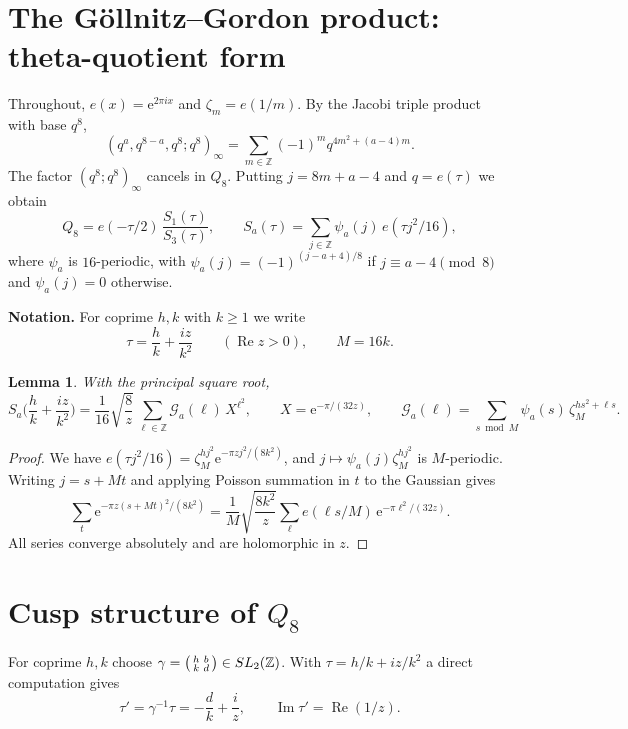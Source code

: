 \documentclass[11pt]{amsart}
\newtheorem{lemma}[theorem]{Lemma}
\theoremstyle{remark}
\theoremstyle{definition}
\newcommand{\Z}{\mathbb Z}
\newcommand{\cG}{\mathcal G}
\newcommand{\Rea}{\operatorname{Re}}
\newcommand{\Ima}{\operatorname{Im}}
\newcommand{\e}{\mathrm e}
\begin{document}
\section{The G\"ollnitz--Gordon product: theta-quotient form}\label{sec:prelim}

Throughout, $e(x)=\e^{2\pi ix}$ and $\zeta_m=e(1/m)$. By the Jacobi triple product with base $q^8$,
\[
(q^a,q^{8-a},q^8;q^8)_\infty=\sum_{m\in\Z}(-1)^mq^{4m^2+(a-4)m}.
\]
The factor $(q^8;q^8)_\infty$ cancels in $Q_8$. Putting $j=8m+a-4$ and $q=e(\tau)$ we obtain
\begin{equation}\label{eq:theta-quotient}
Q_8=e(-\tau/2)\,\frac{S_1(\tau)}{S_3(\tau)},\qquad S_a(\tau)=\sum_{j\in\Z}\psi_a(j)\,e(\tau j^2/16),
\end{equation}
where $\psi_a$ is $16$-periodic, with $\psi_a(j)=(-1)^{(j-a+4)/8}$ if $j\equiv a-4\pmod8$ and $\psi_a(j)=0$ otherwise.

\medskip\noindent\textbf{Notation.} For coprime $h,k$ with $k\ge1$ we write
\[
\tau=\frac hk+\frac{iz}{k^2}\qquad(\Rea z>0),\qquad M=16k .
\]

\begin{lemma}\label{lem:poisson}
With the principal square root,
\[
S_a\Big(\frac hk+\frac{iz}{k^2}\Big)=\frac1{16}\sqrt{\frac8z}\,\sum_{\ell\in\Z}\cG_a(\ell)\,X^{\ell^2},\qquad X=\e^{-\pi/(32z)},\qquad \cG_a(\ell)=\sum_{s\bmod M}\psi_a(s)\,\zeta_M^{hs^2+\ell s}.
\]
\end{lemma}

\begin{proof}
We have $e(\tau j^2/16)=\zeta_M^{hj^2}\e^{-\pi zj^2/(8k^2)}$, and $j\mapsto\psi_a(j)\zeta_M^{hj^2}$ is $M$-periodic. Writing $j=s+Mt$ and applying Poisson summation in $t$ to the Gaussian gives
\[
\sum_{t}\e^{-\pi z(s+Mt)^2/(8k^2)}=\frac1M\sqrt{\frac{8k^2}z}\sum_\ell e(\ell s/M)\,\e^{-\pi\ell^2/(32z)}.
\]
All series converge absolutely and are holomorphic in $z$.
\end{proof}

\section{Cusp structure of $Q_8$}\label{sec:cusps}

For coprime $h,k$ choose $\gamma=\begin{psmallmatrix}h&b\\k&d\end{psmallmatrix}\in SL_2(\Z)$. With $\tau=h/k+iz/k^2$ a direct computation gives
\begin{equation}\label{eq:tauprime}
\tau'=\gamma^{-1}\tau=-\frac dk+\frac iz,\qquad \Ima\tau'=\Rea(1/z).
\end{equation}
\end{document}
